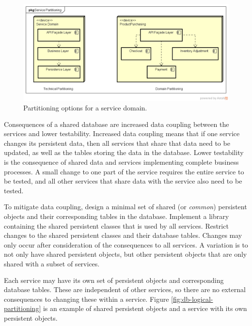 \begin{figure}[h!]
    \centering
    \includegraphics[trim=38 38 19 45,clip,width=\textwidth]{diagrams/service-partitions.png}
    \vspace{-10pt}
    \caption{Partitioning options for a service domain.}
    \label{fig:service-partitions}
\end{figure}

Consequences of a shared database are increased data coupling between the services and lower testability.
Increased data coupling means that if one service changes its persistent data,
then all services that share that data need to be updated, as well as the tables storing the data in the database.
Lower testability is the consequence of shared data and services implementing complete business processes.
A small change to one part of the service requires the entire service to be tested,
and all other services that share data with the service also need to be tested.

To mitigate data coupling, design a minimal set of shared (or \emph{common}) persistent objects and their corresponding tables in the database.
Implement a library containing the shared persistent classes that is used by all services.
Restrict changes to the shared persistent classes and their database tables.
Changes may only occur after consideration of the consequences to all services.
A variation is to not only have shared persistent objects,
but other persistent objects that are only shared with a subset of services.

Each service may have its own set of persistent objects and corresponding database tables.
These are independent of other services, so there are no external consequences to changing these within a service.
Figure \ref{fig:db-logical-partitioning} is an example of shared persistent objects and a service with its own persistent objects.

